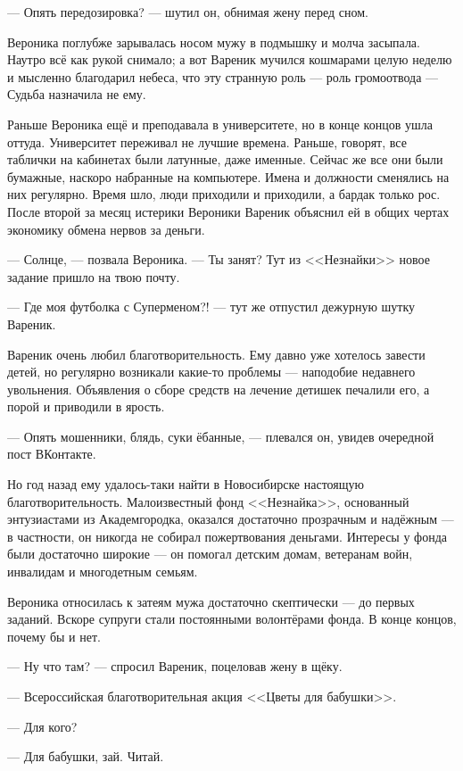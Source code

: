 --- Опять передозировка? --- шутил он, обнимая жену перед сном.

Вероника поглубже зарывалась носом мужу в подмышку и молча засыпала.
Наутро всё как рукой снимало;
а вот Вареник мучился кошмарами целую неделю и мысленно благодарил небеса, что эту странную роль --- роль громоотвода --- Судьба назначила не ему.

Раньше Вероника ещё и преподавала в университете, но в конце концов ушла оттуда.
Университет переживал не лучшие времена.
Раньше, говорят, все таблички на кабинетах были латунные, даже именные.
Сейчас же все они были бумажные, наскоро набранные на компьютере.
Имена и должности сменялись на них регулярно.
Время шло, люди приходили и приходили, а бардак только рос.
После второй за месяц истерики Вероники Вареник объяснил ей в общих чертах экономику обмена нервов за деньги.

\asterism

--- Солнце, --- позвала Вероника.
--- Ты занят?
Тут из <<Незнайки>> новое задание пришло на твою почту.

--- Где моя футболка с Суперменом?! --- тут же отпустил дежурную шутку Вареник.

Вареник очень любил благотворительность.
Ему давно уже хотелось завести детей, но регулярно возникали какие-то проблемы --- наподобие недавнего увольнения.
Объявления о сборе средств на лечение детишек печалили его, а порой и приводили в ярость.

--- Опять мошенники, блядь, суки ёбанные, --- плевался он, увидев очередной пост ВКонтакте.

Но год назад ему удалось-таки найти в Новосибирске настоящую благотворительность.
Малоизвестный фонд <<Незнайка>>, основанный энтузиастами из Академгородка, оказался достаточно прозрачным и надёжным --- в частности, он никогда не собирал пожертвования деньгами.
Интересы у фонда были достаточно широкие --- он помогал детским домам, ветеранам войн, инвалидам и многодетным семьям.

Вероника относилась к затеям мужа достаточно скептически --- до первых заданий.
Вскоре супруги стали постоянными волонтёрами фонда.
В конце концов, почему бы и нет.

--- Ну что там? --- спросил Вареник, поцеловав жену в щёку.

--- Всероссийская благотворительная акция <<Цветы для бабушки>>.

--- Для кого?

--- Для бабушки, зай.
Читай.

